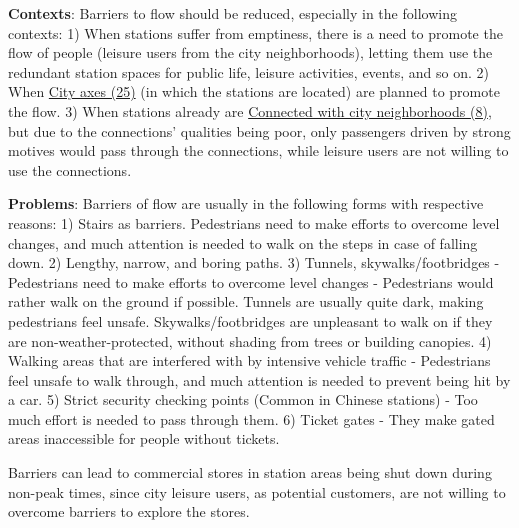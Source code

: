 \documentclass[]{article}
\begin{document}
{\textbf{Contexts}: Barriers to flow should be reduced, especially in the following contexts: 
1) When stations suffer from emptiness, there is a need to promote the flow of people (leisure users from the city neighborhoods), letting them use the redundant station spaces for public life, leisure activities, events, and so on.
2) When \hyperref[(25) City axes]{City axes (25)} (in which the stations are located) are planned to promote the flow.
3) When stations already are \hyperref[Connect with neighborhoods]{Connected with city neighborhoods (8)}, but due to the connections' qualities being poor, only passengers driven by strong motives would pass through the connections, while leisure users are not willing to use the connections.

\textbf{Problems}: Barriers of flow are usually in the following forms with respective reasons: 
1) Stairs as barriers. Pedestrians need to make efforts to overcome level changes, and much attention is needed to walk on the steps in case of falling down.
2) Lengthy, narrow, and boring paths.
3) Tunnels, skywalks/footbridges - Pedestrians need to make efforts to overcome level changes - Pedestrians would rather walk on the ground if possible. Tunnels are usually quite dark, making pedestrians feel unsafe. Skywalks/footbridges are unpleasant to walk on if they are non-weather-protected, without shading from trees or building canopies.
4) Walking areas that are interfered with by intensive vehicle traffic - Pedestrians feel unsafe to walk through, and much attention is needed to prevent being hit by a car.
5) Strict security checking points (Common in Chinese stations) - Too much effort is needed to pass through them. 
6) Ticket gates - They make gated areas inaccessible for people without tickets.

Barriers can lead to commercial stores in station areas being shut down during non-peak times, since city leisure users, as potential customers, are not willing to overcome barriers to explore the stores.


}
\end{document}
